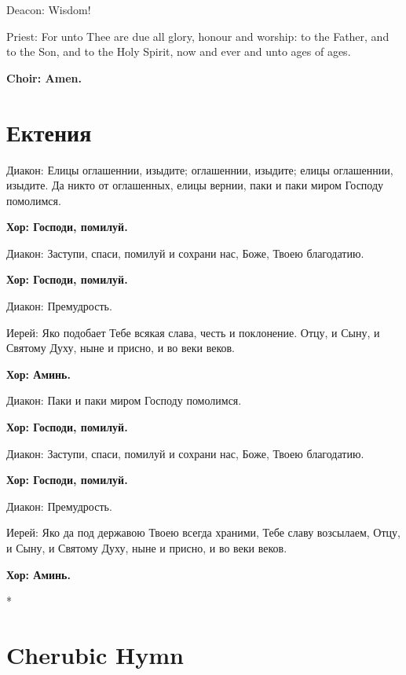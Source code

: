 \documentclass[12pt,a4paper,titlepage]{report}
\begin{document}
\begin{paracol}[1]{2}
	Deacon: Wisdom!
	
	Priest: For unto Thee are due all glory, honour and worship: to the Father, and to the Son, and to the Holy Spirit, now and ever and unto ages of ages.
	
	\textbf{Choir: Amen.}
	
	\switchcolumn[1]
	
	\section*{Ектения}
	
	Диакон: Елицы оглашеннии, изыдите; оглашеннии, изыдите; елицы оглашеннии, изыдите. Да никто от оглашенных, елицы вернии, паки и паки миром Господу помолимся.
	
	\textbf{Хор: Господи, помилуй.}
	
	Диакон: Заступи, спаси, помилуй и сохрани нас, Боже, Твоею благодатию.
	
	\textbf{Хор: Господи, помилуй.}
	
	Диакон: Премудрость.
	
	Иерей: Яко подобает Тебе всякая слава, честь и поклонение. Отцу, и Сыну, и Святому Духу, ныне и присно, и во веки веков.
	
	\textbf{Хор: Аминь.}
	
	Диакон: Паки и паки миром Господу помолимся.
	
	\textbf{Хор: Господи, помилуй.}
	
	Диакон: Заступи, спаси, помилуй и сохрани нас, Боже, Твоею благодатию.
	
	\textbf{Хор: Господи, помилуй.}
	
	Диакон: Премудрость.
	
	Иерей: Яко да под державою Твоею всегда храними, Тебе славу возсылаем, Отцу, и Сыну, и Святому Духу, ныне и присно, и во веки веков.
	
	\textbf{Хор: Аминь.}
	
	\switchcolumn[0]*
	
	\section*{Cherubic Hymn}
	

\end{paracol}
\end{document}
